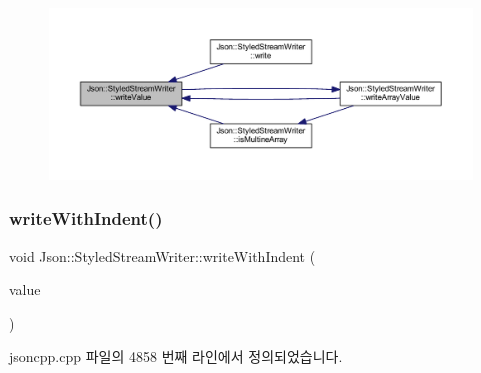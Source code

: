 \begin{figure}[H]
\begin{center}
\leavevmode
\includegraphics[width=350pt]{class_json_1_1_styled_stream_writer_a4359250e09273fa0144021684be001ae_icgraph}
\end{center}
\end{figure}
\mbox{\label{class_json_1_1_styled_stream_writer_a4e64789373b359c9b7a7244509b918fc}} 
\subsubsection{\texorpdfstring{write\+With\+Indent()}{writeWithIndent()}}
{\footnotesize\ttfamily void Json\+::\+Styled\+Stream\+Writer\+::write\+With\+Indent (\begin{DoxyParamCaption}\item[{const \hyperlink{json_8h_a1e723f95759de062585bc4a8fd3fa4be}{J\+S\+O\+N\+C\+P\+P\+\_\+\+S\+T\+R\+I\+NG} \&}]{value }\end{DoxyParamCaption})\hspace{0.3cm}{\ttfamily [private]}}



jsoncpp.\+cpp 파일의 4858 번째 라인에서 정의되었습니다.


